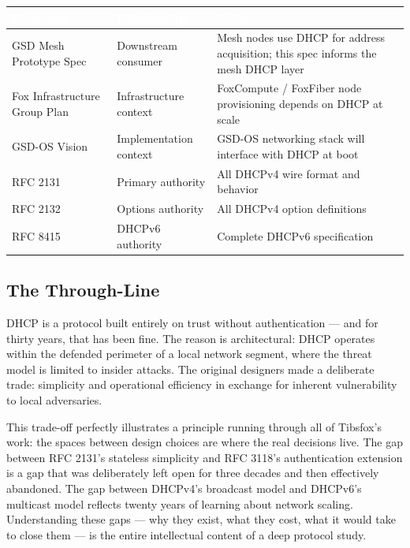\documentclass[11pt,letterpaper]{article}
\newcommand{\tableheader}[1]{\textbf{\sffamily\textcolor{white}{#1}}}
\begin{document}
\begin{center}
\begin{tabularx}{\textwidth}{L{4cm}L{3cm}X}
\toprule
{}
\tableheader{Document} & \tableheader{Relationship} & \tableheader{Notes} \\
\midrule
GSD Mesh Prototype Spec & Downstream consumer & Mesh nodes use DHCP for address acquisition; this spec informs the mesh DHCP layer \\
Fox Infrastructure Group Plan & Infrastructure context & FoxCompute / FoxFiber node provisioning depends on DHCP at scale \\
GSD-OS Vision & Implementation context & GSD-OS networking stack will interface with DHCP at boot \\
RFC 2131 & Primary authority & All DHCPv4 wire format and behavior \\
RFC 2132 & Options authority & All DHCPv4 option definitions \\
RFC 8415 & DHCPv6 authority & Complete DHCPv6 specification \\
\bottomrule
\end{tabularx}
\end{center}

\subsection{The Through-Line}

DHCP is a protocol built entirely on trust without authentication --- and for thirty years, that has been fine. The reason is architectural: DHCP operates within the defended perimeter of a local network segment, where the threat model is limited to insider attacks. The original designers made a deliberate trade: simplicity and operational efficiency in exchange for inherent vulnerability to local adversaries.

This trade-off perfectly illustrates a principle running through all of Tibsfox's work: the spaces between design choices are where the real decisions live. The gap between RFC 2131's stateless simplicity and RFC 3118's authentication extension is a gap that was deliberately left open for three decades and then effectively abandoned. The gap between DHCPv4's broadcast model and DHCPv6's multicast model reflects twenty years of learning about network scaling. Understanding these gaps --- why they exist, what they cost, what it would take to close them --- is the entire intellectual content of a deep protocol study.
\end{document}
